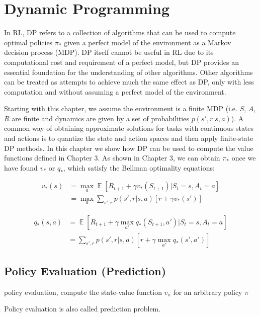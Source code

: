 \documentclass[lang=en,mode=geye,device=normal,color=blue,14pt]{elegantnote}
\DeclareMathOperator*{\E}{\mathbb{E}}
\DeclareMathOperator*{\1}{\mathbbm{1}}
\begin{document}
\section{Dynamic Programming}

In RL, DP refers to a collection of algorithms that can be used to compute optimal policies $\pi_*$ given a perfect model of the environment as a Markov decision process (MDP).
DP itself cannot be useful in RL due to its computational cost and requirement of a perfect model, but DP provides an essential foundation for the understanding of other algorithms.
Other algorithms can be treated as attempts to achieve much the same effect as DP, only with less computation and without assuming a perfect model of the environment.

Starting with this chapter, we assume the environment is a finite MDP (i.e. $S$, $A$, $R$ are finite and dynamics are given by a set of probabilities $p(s',r|s,a)$).
A common way of obtaining approximate solutions for tasks with continuous states and actions is to quantize the state and action spaces and then apply finite-state DP methods.
In this chapter we show how DP can be used to compute the value functions defined in Chapter 3. As shown in Chapter 3, we can obtain $\pi_*$ once we have found $v_*$ or $q_*$, which satisfy the Bellman optimality equations:

\begin{align*}
v_*(s) & = \max_a \E [R_{t+1} + \gamma v_*(S_{t+1}) | S_t = s, A_t = a] \\
& = \max_a \sum_{s',r} p(s',r|s,a)[r + \gamma v_*(s')]
\end{align*}

\begin{align*}
q_*(s,a) & = \E [R_{t+1} + \gamma \max_{a'} q_*(S_{t+1},a') | S_t = s, A_t = a] \\
& = \sum_{s',r} p(s',r|s,a)[r+\gamma \max_{a'} q_*(s',a')]
\end{align*}

\subsection{Policy Evaluation (Prediction)}
\begin{definition}
policy evaluation, compute the state-value function $v_\pi$ for an arbitrary policy $\pi$
\end{definition}

Policy evaluation is also called prediction problem.
\end{document}
